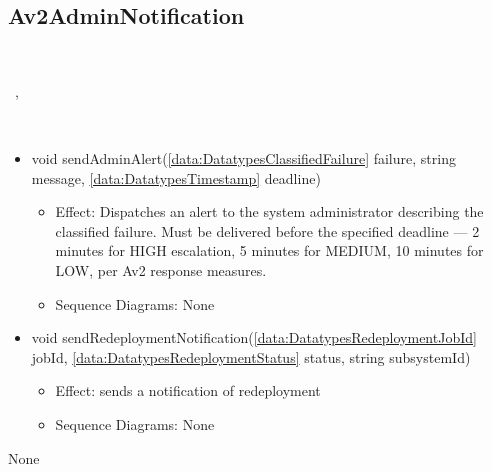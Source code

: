   \subsection{Av2AdminNotification}\label{int:InterfacesAv2AdminNotification}
    \begin{description}
      \item[Provided by:] \iconcomponent{}~
      \item[Required by:] \iconcomponent{}~, \iconcomponent{}~ 
      \item[Operations:] ~
    \begin{itemize}[noitemsep,nolistsep,leftmargin=-.25cm]
      \item \textsf{void sendAdminAlert(\ref{data:DatatypesClassifiedFailure} failure, string message, \ref{data:DatatypesTimestamp} deadline)}
        \begin{itemize}[noitemsep,nolistsep]
           \item Effect: Dispatches an alert to the system administrator describing the classified failure. Must be delivered before the specified deadline — 2 minutes for HIGH escalation, 5 minutes for MEDIUM, 10 minutes for LOW, per Av2 response measures. 
           \item Sequence Diagrams: None
        \end{itemize}
      \item \textsf{void sendRedeploymentNotification(\ref{data:DatatypesRedeploymentJobId} jobId, \ref{data:DatatypesRedeploymentStatus} status, string subsystemId)}
        \begin{itemize}[noitemsep,nolistsep]
           \item Effect: sends a notification of redeployment 
           \item Sequence Diagrams: None
        \end{itemize}
    \end{itemize}
      \item[Diagrams:] None
    \end{description}

